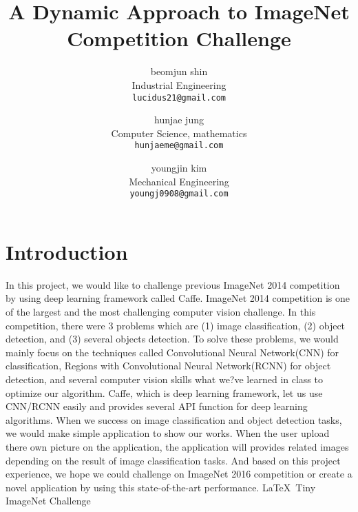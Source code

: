 \documentclass[10pt,twocolumn,letterpaper]{article}
\begin{document}
\title{A Dynamic Approach to ImageNet Competition Challenge}

\author{beomjun shin\\
Industrial Engineering\\
{\tt\small lucidus21@gmail.com}
\and
hunjae jung\\
Computer Science, mathematics\\
{\tt\small hunjaeme@gmail.com}
\and
youngjin kim\\
Mechanical Engineering\\
{\tt\small youngj0908@gmail.com}
}

\maketitle

\section{Introduction}

In this project, we would like to challenge previous ImageNet 2014 competition by using deep learning framework called Caffe.
ImageNet 2014 competition is one of the largest and the most challenging computer vision challenge.
In this competition, there were 3 problems which are (1) image classification, (2) object detection, and (3) several objects detection.
To solve these problems, we would mainly focus on the techniques called Convolutional Neural Network(CNN) for classification, Regions with Convolutional Neural Network(RCNN) for object detection, and several computer vision skills what we?ve learned in class to optimize our algorithm.
Caffe, which is deep learning framework, let us use CNN/RCNN easily and provides several API function for deep learning algorithms.
When we success on image classification and object detection tasks, we would make simple application to show our works.
When the user upload there own picture on the application, the application will provides related images depending on the result of image classification tasks.
And based on this project experience, we hope we could challenge on ImageNet 2016 competition or create a novel application by using this state-of-the-art performance.
\LaTeX\ Tiny ImageNet Challenge
\end{document}
